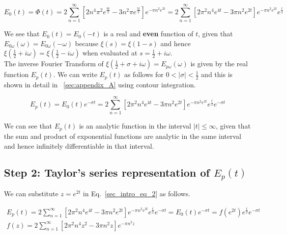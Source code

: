 \documentclass[11pt]{elsarticle}
\begin{document}
\begin{equation}\label{sec_intro_eq_1}
E_{0}(t) = \Phi(t) = 2 \sum_{n=1}^{\infty}  [ 2 n^{4}  \pi^{2} e^{\frac{9t}{2}}    - 3 n^{2} \pi  e^{\frac{5t}{2}} ]  e^{- \pi n^{2} e^{2t}} =    2 \sum_{n=1}^{\infty}  [ 2 \pi^{2} n^{4} e^{4t}    - 3 \pi n^{2}   e^{2t} ]  e^{- \pi n^{2} e^{2t}} e^{\frac{t}{2}}   
\end{equation}

We see that $E_{0}(t)=E_{0}(-t)$ is a real and \textbf{even} function of $t$, given that  $E_{0\omega}(\omega) = E_{0\omega}(-\omega)$ because $\xi(s)=\xi(1-s)$ and hence $\xi(\frac{1}{2} + i \omega)=\xi(\frac{1}{2} - i \omega)$ when evaluated at $s = \frac{1}{2} + i \omega$.  \\

The inverse Fourier Transform of   $\xi(\frac{1}{2}+ \sigma + i \omega) = E_{p\omega}(\omega)$ is given by the real function $E_p(t)$.  We can write $E_p(t)$ as follows for $0 < |\sigma| < \frac{1}{2}$ and this is shown in detail in ~\ref{sec:appendix_A} using contour integration.

\begin{equation}\label{sec_intro_eq_2}
E_{p}(t) = E_{0}(t) e^{-\sigma t} =   2 \sum_{n=1}^{\infty}  [ 2 \pi^{2} n^{4} e^{4t}    - 3 \pi n^{2}   e^{2t} ]  e^{- \pi n^{2} e^{2t}} e^{\frac{t}{2}} e^{-\sigma t} 
\end{equation}

We can see that $E_{p}(t)$ is an analytic function in the interval $|t| \leq \infty$, given that the sum and product of exponential functions are analytic in the same interval and hence infinitely differentiable in that interval.


\subsection{\label{sec:Section_1_2} \textbf{Step 2: Taylor's series representation of $E_p(t)$} \protect\\  \lowercase{} }

We can substitute $z= e^{2t}$ in Eq.~\ref{sec_intro_eq_2} as follows. 


\begin{eqnarray*}\label{app_B1_eq_1}  
E_{p}(t) =    2 \sum_{n=1}^{\infty}  [ 2 \pi^{2} n^{4} e^{4t}    - 3 \pi n^{2}   e^{2t} ]  e^{- \pi n^{2} e^{2t}} e^{\frac{t}{2}} e^{-\sigma t} = E_{0}(t) e^{-\sigma t} = f(e^{2t}) e^{\frac{t}{2}} e^{-\sigma t} \\ 
f(z)= 2 \sum_{n=1}^{\infty}  [ 2 \pi^{2} n^{4} z^{2}    - 3 \pi n^{2}   z ]  e^{- \pi n^{2} z}   
\end{eqnarray*}
\begin{equation} \end{equation}
\end{document}
